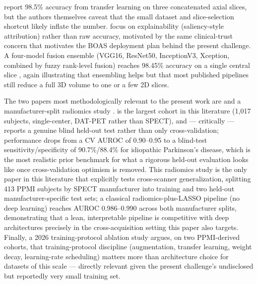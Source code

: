 \documentclass[10pt]{article}
\begin{document}
\citet{quan2019} report 98.5\% accuracy from transfer learning on three concatenated axial slices, but the authors themselves caveat that the small dataset and slice-selection shortcut likely inflate the number. \citet{nazari2021} focus on explainability (saliency-style attribution) rather than raw accuracy, motivated by the same clinical-trust concern that motivates the BOAS deployment plan behind the present challenge. A four-model fusion ensemble (VGG16, ResNet50, InceptionV3, Xception, combined by fuzzy rank-level fusion) reaches 98.45\% accuracy on a single central slice \citep{ensemblefusion2022}, again illustrating that ensembling helps but that most published pipelines still reduce a full 3D volume to one or a few 2D slices.

The two papers most methodologically relevant to the present work are \citet{zhao2022} and a manufacturer-split radiomics study \citep{radiomics2022}. \citet{zhao2022} is the largest cohort in this literature (1{,}017 subjects, single-center, DAT-PET rather than SPECT), and --- critically --- reports a genuine blind held-out test rather than only cross-validation; performance drops from a CV AUROC of 0.90--0.95 to a blind-test sensitivity/specificity of 90.7\%/88.4\% for idiopathic Parkinson's disease, which is the most realistic prior benchmark for what a rigorous held-out evaluation looks like once cross-validation optimism is removed. This radiomics study \citep{radiomics2022} is the only paper in this literature that explicitly tests cross-scanner generalization, splitting 413 PPMI subjects by SPECT manufacturer into training and two held-out manufacturer-specific test sets; a classical radiomics-plus-LASSO pipeline (no deep learning) reaches AUROC 0.986--0.990 across both manufacturer splits, demonstrating that a lean, interpretable pipeline is competitive with deep architectures precisely in the cross-acquisition setting this paper also targets. Finally, a 2026 training-protocol ablation study \citep{trainingprotocol2026} argues, on two PPMI-derived cohorts, that training-protocol discipline (augmentation, transfer learning, weight decay, learning-rate scheduling) matters more than architecture choice for datasets of this scale --- directly relevant given the present challenge's undisclosed but reportedly very small training set.
\end{document}
